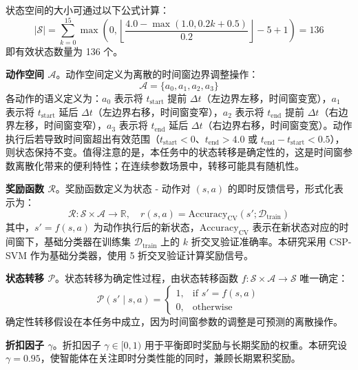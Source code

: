 状态空间的大小可通过以下公式计算：
\begin{equation}
|\mathcal{S}| = \sum_{k=0}^{15} \max\left(0, \left\lfloor \frac{4.0 - \max(1.0, 0.2k + 0.5)}{0.2} \right\rfloor - 5 + 1\right) = 136
\end{equation}
即有效状态数量为 136 个。

\textbf{动作空间 $\mathcal{A}$}。动作空间定义为离散的时间窗边界调整操作：
\begin{equation}
\mathcal{A} = \{a_0, a_1, a_2, a_3\}
\end{equation}
各动作的语义定义为：$a_0$ 表示将 $t_{\text{start}}$ 提前 $\Delta t$（左边界左移，时间窗变宽），$a_1$ 表示将 $t_{\text{start}}$ 延后 $\Delta t$（左边界右移，时间窗变窄），$a_2$ 表示将 $t_{\text{end}}$ 提前 $\Delta t$（右边界左移，时间窗变窄），$a_3$ 表示将 $t_{\text{end}}$ 延后 $\Delta t$（右边界右移，时间窗变宽）。动作执行后若导致时间窗超出有效范围（$t_{\text{start}} < 0$、$t_{\text{end}} > 4.0$ 或 $t_{\text{end}} - t_{\text{start}} < 0.5$），则状态保持不变。值得注意的是，本任务中的状态转移是确定性的，这是时间窗参数离散化带来的便利特性；在连续参数场景中，转移可能具有随机性。

\textbf{奖励函数 $\mathcal{R}$}。奖励函数定义为状态 - 动作对 $(s, a)$ 的即时反馈信号，形式化表示为：
\begin{equation}
\mathcal{R}: \mathcal{S} \times \mathcal{A} \rightarrow \mathbb{R}, \quad r(s, a) = \text{Accuracy}_{\text{CV}}(s'; \mathcal{D}_{\text{train}})
\end{equation}
其中，$s' = f(s, a)$ 为动作执行后的新状态，$\text{Accuracy}_{\text{CV}}$ 表示在新状态对应的时间窗下，基础分类器在训练集 $\mathcal{D}_{\text{train}}$ 上的 $k$ 折交叉验证准确率。本研究采用 CSP-SVM 作为基础分类器\cite{blankertz2008optimizing}，使用 5 折交叉验证计算奖励信号。

\textbf{状态转移 $\mathcal{P}$}。状态转移为确定性过程，由状态转移函数 $f: \mathcal{S} \times \mathcal{A} \rightarrow \mathcal{S}$ 唯一确定：
\begin{equation}
\mathcal{P}(s' \mid s, a) =
\begin{cases}
1, & \text{if } s' = f(s, a) \\
0, & \text{otherwise}
\end{cases}
\end{equation}
确定性转移假设在本任务中成立，因为时间窗参数的调整是可预测的离散操作。

\textbf{折扣因子 $\gamma$}。折扣因子 $\gamma \in [0, 1)$ 用于平衡即时奖励与长期奖励的权重。本研究设 $\gamma = 0.95$，使智能体在关注即时分类性能的同时，兼顾长期累积奖励。

